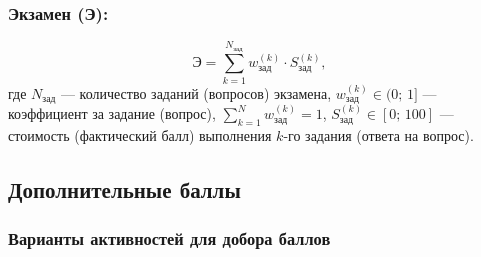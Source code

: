 \documentclass[10pt,a4paper]{article}
\begin{document}
    \subsubsection{Экзамен (Э):}
    \begin{equation}
        \text{Э} = \sum_{k=1}^{N_{\text{зад}}} w_{\text{зад}}^{(k)} \cdot S_{\text{зад}}^{(k)},
    \end{equation}
    где $N_{\text{зад}}$ --- количество заданий (вопросов) экзамена, $w_{\text{зад}}^{(k)} \in (0;\,1]$ --- коэффициент за задание (вопрос), $\sum\limits_{k=1}^{N} w_{\text{зад}}^{(k)} = 1$, $S_{\text{зад}}^{(k)} \in [0;\,100]$ --- стоимость (фактический балл) выполнения $k$-го задания (ответа на вопрос).

    \subsection{Дополнительные баллы}

    \subsubsection{Варианты активностей для добора баллов}
\end{document}
